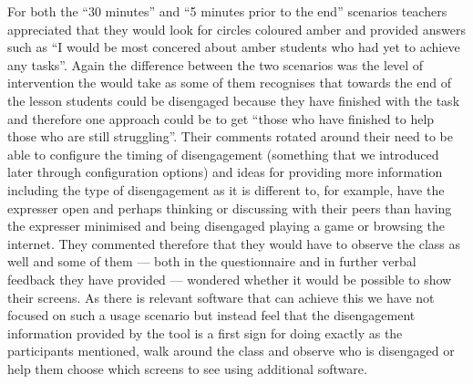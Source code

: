 For both the “30 minutes” and “5 minutes prior to the end” scenarios
teachers appreciated that they would look for circles coloured amber
and provided answers such as “I would be most concered about amber
students who had yet to achieve any tasks”. Again the difference
between the two scenarios was the level of intervention the would take
as some of them recognises that towards the end of the lesson students
could be disengaged because they have finished with the task and
therefore one approach could be to get “those who have finished to
help those who are still struggling”. Their comments rotated around
their need to be able to configure the timing of disengagement
(something that we introduced later through configuration options) and
ideas for providing more information including the type of
disengagement as it is different to, for example, have the expresser
open and perhaps thinking or discussing with their peers than having
the expresser minimised and being disengaged playing a game or
browsing the internet. They commented therefore that they would have
to observe the class as well and some of them --- both in the
questionnaire and in further verbal feedback they have provided ---
wondered whether it would be possible to show their screens. As there
is relevant software that can achieve this we have not focused on such
a usage scenario but instead feel that the disengagement information
provided by the tool is a first sign for doing exactly as the
participants mentioned, walk around the class and observe who is
disengaged or help them choose which screens to see using additional
software. 




